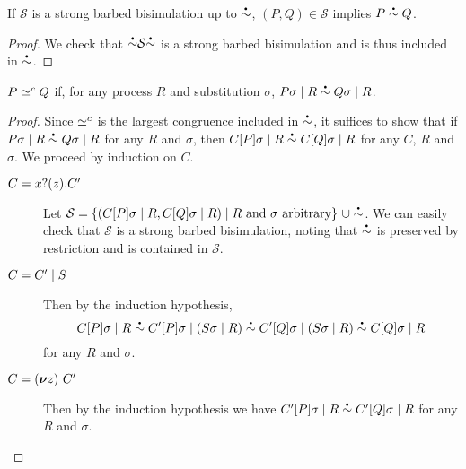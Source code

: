 \begin{lemma}\label{lemma:up-to}
  If \( \mathcal{S} \) is a strong barbed bisimulation up to \( \sbbisim{}{} \), \( (P,Q) \in \mathcal{S} \) implies \( \sbbisim{P}{Q} \).
\end{lemma}
\begin{proof}
  We check that \( \uptosbb{}{\mathcal{S}}{} \) is a strong barbed bisimulation and is thus included in \( \sbbisim{}{} \).
\end{proof}

\begin{theorem}
  \( P \simeq^c Q \) if, for any process \( R \) and
  substitution \( \sigma \),
  \(
  \sbbisim{\Ppar{\applysubst{\sigma}{P}}{R}}{\Ppar{\applysubst{\sigma}{Q}}{R}}
  \).
\end{theorem}
\begin{proof}
  Since \( \simeq^c \) is the largest congruence included in \( \sbbisim{}{} \), it suffices to show that if \( \sbbisim{\Ppar{\applysubst{\sigma}{P}}{R}}{\Ppar{\applysubst{\sigma}{Q}}{R}} \) for any \( R \) and \( \sigma \), then \( \sbbisim{\Ppar{\applysubst{\sigma}{\applyctx{C}{P}}}{R}}{\Ppar{\applysubst{\sigma}{\applyctx{C}{Q}}}{R}} \) for any \( C \), \( R \) and \( \sigma \).
  We proceed by induction on \( C \).
  \begin{description}
  \item[\( C = x ? (z) . C' \)] Let \( \mathcal{S} = \{ (\Ppar{\applysubst{\sigma}{\applyctx{C}{P}}}{R}, \Ppar{\applysubst{\sigma}{\applyctx{C}{Q}}}{R}) \mid \text{$R$ and $\sigma$ arbitrary} \}~\cup \sbbisim{}{} \).
    We can easily check that \( \mathcal{S} \) is a strong barbed bisimulation, noting that \( \sbbisim{}{} \) is preserved by restriction and is contained in \( \mathcal{S} \).
  \item[\( C = C' \mid S \)] Then by the induction hypothesis,
    \begin{equation*}
      \sbbisim{\sbbisim{\Ppar{\applysubst{\sigma}{\applyctx{C}{P}}}{R}}{\Ppar{\applysubst{\sigma}{\applyctx{C'}{P}}}{(\Ppar{\applysubst{\sigma}{S}}{R})}}}{\sbbisim{\Ppar{\applysubst{\sigma}{\applyctx{C'}{Q}}}{(\Ppar{\applysubst{\sigma}{S}}{R})}}{\Ppar{\applysubst{\sigma}{\applyctx{C}{Q}}}{R}}}
    \end{equation*}
    for any \( R \) and \( \sigma \).
  \item[\( C = (\bm{\nu} z)~C' \)] Then by the induction hypothesis we have \( \sbbisim{\Ppar{\applysubst{\sigma}{\applyctx{C'}{P}}}{R}}{\Ppar{\applysubst{\sigma}{\applyctx{C'}{Q}}}{R}} \) for any \( R \) and \( \sigma \).

\end{description}
\end{proof}
